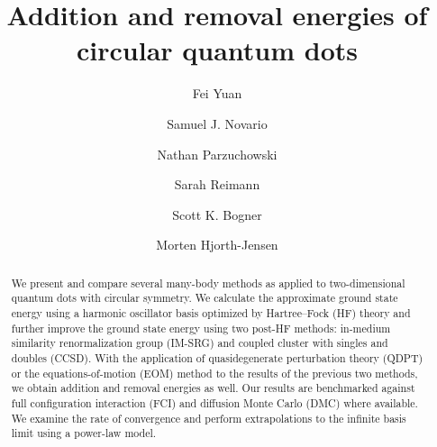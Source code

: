 
\usepackage{amsmath}
\usepackage{amssymb}
\usepackage{bm}
\usepackage{booktabs}
\usepackage{color}
\usepackage{graphicx}
\usepackage{hyperref}
\usepackage{natbib}
\usepackage{scalerel}
\usepackage{siunitx}

\newcommand{\D}{\operatorname{d\!}}
\newcommand{\E}{\operatorname{e}}
\newcommand{\bra}[1]{\langle #1 |}
\newcommand{\braket}[2]{\langle #1 | #2\rangle}
\newcommand{\ket}[1]{| #1 \rangle}
\newcommand{\normord}[1]{\mathopen: #1 \mathclose:}
\newcommand{\antisymm}{\mathop{\scalerel*{\mathcal{A}}{\textstyle\sum}}\displaylimits}


\title{Addition and removal energies of circular quantum dots}

\author{Fei Yuan}
\author{Samuel J. Novario}
\author{Nathan Parzuchowski}
\author{Sarah Reimann}
\author{Scott K. Bogner}
\author{Morten Hjorth-Jensen}

\begin{abstract}
  We present and compare several many-body methods as applied to two-dimensional quantum dots with circular symmetry.  We calculate the approximate ground state energy using a harmonic oscillator basis optimized by Hartree--Fock (HF) theory and further improve the ground state energy using two post-HF methods: in-medium similarity renormalization group (IM-SRG) and coupled cluster with singles and doubles (CCSD).  With the application of quasidegenerate perturbation theory (QDPT) or the equations-of-motion (EOM) method to the results of the previous two methods, we obtain addition and removal energies as well.  Our results are benchmarked against full configuration interaction (FCI) and diffusion Monte Carlo (DMC) where available.  We examine the rate of convergence and perform extrapolations to the infinite basis limit using a power-law model.
\end{abstract}

